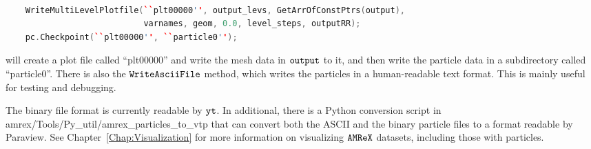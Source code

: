 \begin{lstlisting}[language=cpp]

    WriteMultiLevelPlotfile(``plt00000'', output_levs, GetArrOfConstPtrs(output),
                            varnames, geom, 0.0, level_steps, outputRR);
    pc.Checkpoint(``plt00000'', ``particle0'');

\end{lstlisting}

will create a plot file called ``plt00000'' and write the mesh data in $\tt{output}$ to it, and then write the particle data in a subdirectory called ``particle0''. There is also the $\tt{WriteAsciiFile}$ method, which writes the particles in a human-readable text format. This is mainly useful for testing and debugging.

The binary file format is currently readable by $\tt{yt}$. In additional, there is a Python conversion script in amrex/Tools/Py\_util/amrex\_particles\_to\_vtp that can convert both the ASCII and the binary particle files to a format readable by Paraview. See Chapter~\ref{Chap:Visualization} for more information on visualizing $\tt{AMReX}$ datasets, including those with particles. 
